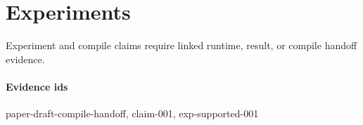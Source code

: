 \section{Experiments}
Experiment and compile claims require linked runtime, result, or compile handoff evidence.

\paragraph{Evidence ids} paper-draft-compile-handoff, claim-001, exp-supported-001

